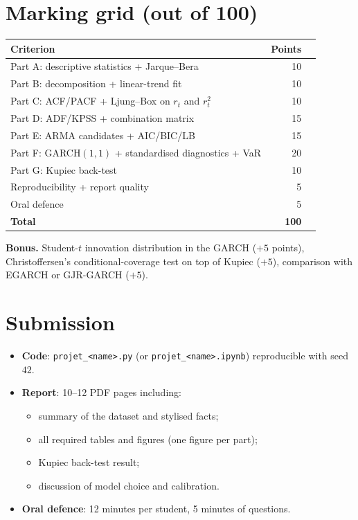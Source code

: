 \documentclass[a4paper,11pt]{article}
\begin{document}
\section*{Marking grid (out of 100)}

\begin{center}
\begin{tabular}{p{8cm}rl}
\toprule
\textbf{Criterion} & \textbf{Points} & \\
\midrule
Part A: descriptive statistics + Jarque--Bera     & 10 \\
Part B: decomposition + linear-trend fit          & 10 \\
Part C: ACF/PACF + Ljung--Box on $r_t$ and $r_t^2$ & 10 \\
Part D: ADF/KPSS + combination matrix             & 15 \\
Part E: ARMA candidates + AIC/BIC/LB              & 15 \\
Part F: GARCH$(1,1)$ + standardised diagnostics + VaR & 20 \\
Part G: Kupiec back-test                          & 10 \\
Reproducibility + report quality                  &  5 \\
Oral defence                                      &  5 \\
\midrule
\textbf{Total}                                    & \textbf{100} \\
\bottomrule
\end{tabular}
\end{center}

\medskip
\noindent\textbf{Bonus.} Student-$t$ innovation distribution in the
GARCH (\(+5\) points), Christoffersen's conditional-coverage test
on top of Kupiec ($+5$), comparison with EGARCH or GJR-GARCH
($+5$).

\section*{Submission}

\begin{itemize}
  \item \textbf{Code}: \texttt{projet\_<name>.py} (or
        \texttt{projet\_<name>.ipynb}) reproducible with seed $42$.
  \item \textbf{Report}: 10--12 PDF pages including:
        \begin{itemize}
          \item summary of the dataset and stylised facts;
          \item all required tables and figures (one figure per
                part);
          \item Kupiec back-test result;
          \item discussion of model choice and calibration.
        \end{itemize}
  \item \textbf{Oral defence}: 12 minutes per student, 5 minutes
        of questions.
\end{itemize}
\end{document}
